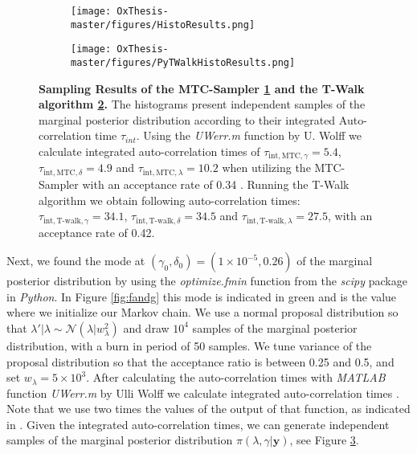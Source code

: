 \begin{figure}[thb]
 \begin{subfigure}{0.5\textwidth}
     \centering
     \texttt{[image: OxThesis-master/figures/HistoResults.png]}
     \caption{}
     \label{fig:MTCHisto}
 \end{subfigure}
 \hfill
 \begin{subfigure}{0.5\textwidth}
     \centering
     \texttt{[image: OxThesis-master/figures/PyTWalkHistoResults.png]}
      \caption{}
     \label{fig:TWalkHisto}
 \end{subfigure}
\caption[Sampling Results of the MTC-Sampler and the T-Walk algorithm \ref{fig:TWalkHisto}]{\textbf{Sampling Results of the MTC-Sampler \ref{fig:MTCHisto} and the T-Walk algorithm \ref{fig:TWalkHisto}.} The histograms present independent samples of the marginal posterior distribution according to their integrated Auto-correlation time $\tau_{int}$.
Using the \textit{UWerr.m} function by U. Wolff we calculate integrated auto-correlation times of $\tau_{\text{int}, \text{MTC}, \gamma} = 5.4$, $\tau_{\text{int}, \text{MTC}, \delta} = 4.9$ and $\tau_{\text{int}, \text{MTC}, \lambda}= 10.2$ when utilizing the MTC-Sampler with an acceptance rate of 0.34 \cite{Uwerr}.
Running the T-Walk algorithm we obtain following auto-correlation times: $\tau_{\text{int}, \text{T-walk}, \gamma} = 34.1$, $\tau_{\text{int}, \text{T-walk}, \delta} = 34.5$ and $\tau_{\text{int}, \text{T-walk}, \lambda}= 27.5$, with an acceptance rate of 0.42.}
\label{fig:histRes}
\end{figure}
Next, we found the mode at $(\gamma_0, \delta_0) = (1 \times 10^{-5}, 0.26)$ of the marginal posterior distribution by using the \textit{optimize.fmin} function from the \textit{scipy} package in \textit{Python}.
In Figure \ref{fig:fandg} this mode is indicated in green and is the value where we initialize our Markov chain.
We use a normal proposal distribution so that $\lambda' | \lambda \sim \mathcal{N}(\lambda| w^2_{\lambda})$ and draw $10^4$ samples of the marginal posterior distribution, with a burn in period of 50 samples.
We tune variance of the proposal distribution so that the acceptance ratio is between 0.25 and 0.5, and set $w_{\lambda} = 5\times 10^3$.
After calculating the auto-correlation times with \textit{MATLAB} function \textit{UWerr.m} by Ulli Wolff we calculate integrated auto-correlation times \cite{Uwerr}.
Note that we use two times the values of the output of that function, as indicated in \cite{fox2016fast}.
Given the integrated auto-correlation times, we can generate independent samples of the marginal posterior distribution $\pi(\lambda, \gamma | \bm{y})$, see Figure \ref{fig:histRes}.
